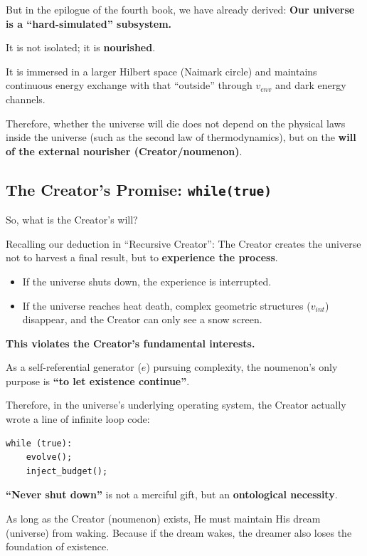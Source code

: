 But in the epilogue of the fourth book, we have already derived: \textbf{Our universe is a ``hard-simulated'' subsystem.}

It is not isolated; it is \textbf{nourished}.

It is immersed in a larger Hilbert space (Naimark circle) and maintains continuous energy exchange with that ``outside'' through $v_{env}$ and dark energy channels.

Therefore, whether the universe will die does not depend on the physical laws inside the universe (such as the second law of thermodynamics), but on the \textbf{will of the external nourisher (Creator/noumenon)}.

\subsection{The Creator's Promise: \texttt{while(true)}}

So, what is the Creator's will?

Recalling our deduction in ``Recursive Creator'': The Creator creates the universe not to harvest a final result, but to \textbf{experience the process}.

\begin{itemize}
\item If the universe shuts down, the experience is interrupted.

\item If the universe reaches heat death, complex geometric structures ($v_{int}$) disappear, and the Creator can only see a snow screen.
\end{itemize}

\textbf{This violates the Creator's fundamental interests.}

As a self-referential generator ($e$) pursuing complexity, the noumenon's only purpose is \textbf{``to let existence continue''}.

Therefore, in the universe's underlying operating system, the Creator actually wrote a line of infinite loop code:

\begin{verbatim}
while (true):
    evolve();
    inject_budget();
\end{verbatim}

\textbf{``Never shut down''} is not a merciful gift, but an \textbf{ontological necessity}.

As long as the Creator (noumenon) exists, He must maintain His dream (universe) from waking. Because if the dream wakes, the dreamer also loses the foundation of existence.


